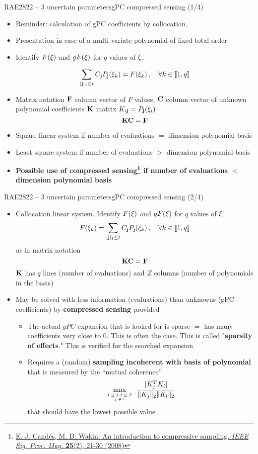 \documentclass[10pt]{beamer}
\def\vt{\vspace{2mm}}
\def\vf{\vspace{4mm}}
\def\begit{\begin{itemize}}
\def\endit{\end{itemize}}
\newcommand{\xig}{{\bf \xi}}
\begin{document}
\begin{frame}{RAE2822 -- 3 uncertain parameters}{gPC compressed sensing (1/4)}  
%
\footnotesize{
%
\begit

\item Reminder: calculation of gPC coefficients by collocation. 
\item Presentation in case of a multi-variate polynomial of fixed total order
 \vf
\item[] Identify $F({\bf \xi})$ and  $gF({\bf \xi})$ for $q$ values of ${\bf \xi}$. 

  $$  \sum_{ | {\bf j} |_1 \leq t} C_{\bf j} P_{\bf j}(\xig_k) = F(\xig_ k)\,,\quad\forall k \in \llbracket 1,q\rrbracket $$

\vt
\item Matrix notation $ {\bf F}  $ column vector of $F$ values, ${\bf C}$ column vector of unknown polynomial coefficients 
 ${\bf K}$ matrix $K_{i{\bf j}}=  P_{\bf j}(\xi_i) $
%
    $$   {\bf K}{\bf C} = {\bf F}  $$
\item Square linear system if number of evaluations $=$ dimension polynomial basis 
\item Least square system if number of evaluations $>$ dimension polynomial basis
\item {\bf Possible use of  compressed sensing\footnote{\href{\webDOI/10.1109/MSP.2007.914731}{\scriptsize{E. J. Cand\`es, M. B. Wakin: An introduction to compressive sampling. {\sl IEEE Sig. Proc. Mag.} {\bf 25}(2), 21-30 (2008)}}} if number of evaluations $<$ dimension polynomial basis} 
%
\endit
%
}
%
\end{frame} 
%
%
\begin{frame}{RAE2822 -- 3 uncertain parameters}{gPC compressed sensing (2/4)}  
%
\footnotesize{
%
\begit
\item[] Collocation linear system. Identify $F({\bf \xi})$ and  $gF({\bf \xi})$ for $q$ values of ${\bf \xi}$. 
%
  $$ F(\xig_k)= \sum_{ | {\bf j} |_1 \leq t} C_{\bf j} P_{\bf j}(\xig_k)\,,\quad\forall k \in \llbracket 1,q\rrbracket $$
%
or in matrix notation %
    $$   {\bf K}{\bf C} = {\bf F}  $$
${\bf K}$ has $q$ lines (number of evaluations) and  $Z$ columns (number of polynomials in the basis)  
\vt
\item May be solved with less information (evaluations) than unknowns (gPC coefficients) by {\bf compressed sensing} provided
   \begit
   \item The actual $gPC$ expansion that is looked for is sparse $=$ has many coefficients very close to 0. 
 This is often the case. This is called "{\bf sparsity of effects}." This is verified for the searched expansion  
   \item Requires a (random) {\bf sampling incoherent with basis of polynomial} that is measured by the ``mutual coherence''
   $$ \max_{\tiny\begin{array}{c}1\leq j,l\leq Z \\ j\neq l\end{array}}\frac{| K_j^T K_l|}{ \| K_j\|_2 \| K_l \|_2}\ $$
   that should have the lowest possible value
   \endit
%
\endit
%
}
%
\end{frame} 
\end{document}
